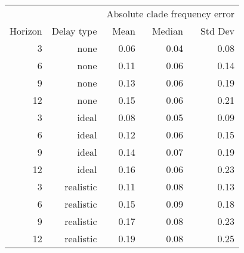 
\begin{tabular*}{0.7\textwidth}{rrrrr}
\toprule
        &            & \multicolumn{3}{c}{Absolute clade frequency error} \\
Horizon & Delay type & Mean & Median & Std Dev \\
\midrule

3 & none & 0.06 & 0.04 & 0.08 \\
6 & none & 0.11 & 0.06 & 0.14 \\
9 & none & 0.13 & 0.06 & 0.19 \\
12 & none & 0.15 & 0.06 & 0.21 \\
3 & ideal & 0.08 & 0.05 & 0.09 \\
6 & ideal & 0.12 & 0.06 & 0.15 \\
9 & ideal & 0.14 & 0.07 & 0.19 \\
12 & ideal & 0.16 & 0.06 & 0.23 \\
3 & realistic & 0.11 & 0.08 & 0.13 \\
6 & realistic & 0.15 & 0.09 & 0.18 \\
9 & realistic & 0.17 & 0.08 & 0.23 \\
12 & realistic & 0.19 & 0.08 & 0.25 \\

\bottomrule
\end{tabular*}

